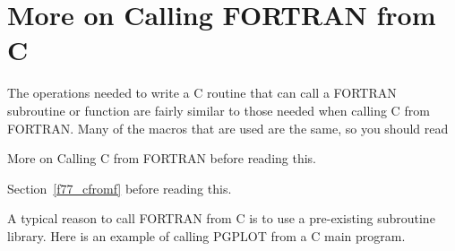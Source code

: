 \documentclass[twoside,11pt]{article}
\newcommand{\htmlref}[2]{#1}
\newcommand{\latex}[1]{#1}
\newcommand{\xlabel}[1]{}
\renewcommand{\_}{\texttt{\symbol{95}}}
\begin{document}
\section{\xlabel{more_on_calling_fortran_from_c}\label{f77_ffromc}More on
Calling FORTRAN from C}

The operations needed to write a C routine that can call a FORTRAN subroutine
or function are fairly similar to those needed when calling C from FORTRAN\@.
Many of the macros that are used are the same, so you should read
\begin{htmlonly}
\htmlref{More on Calling C from FORTRAN}{f77_cfromf} before reading this.
\end{htmlonly}
\latex{Section~\ref{f77_cfromf} before reading this.}

A typical reason to call FORTRAN from C is to use a pre-existing subroutine
library. Here is an example of calling PGPLOT from a C main program.
\end{document}
